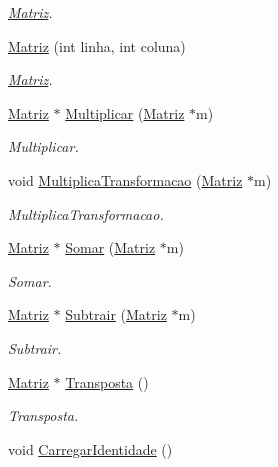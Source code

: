 \begin{DoxyCompactItemize}
\begin{DoxyCompactList}\small\item\em \hyperlink{class_matriz}{Matriz}. \end{DoxyCompactList}\item 
\hyperlink{class_matriz_a57a8c6b672158239b429c72f4b4e316c}{Matriz} (int linha, int coluna)
\begin{DoxyCompactList}\small\item\em \hyperlink{class_matriz}{Matriz}. \end{DoxyCompactList}\item 
\hyperlink{class_matriz}{Matriz} $\ast$ \hyperlink{class_matriz_af9f66302d01429ea558f420ba42175ab}{Multiplicar} (\hyperlink{class_matriz}{Matriz} $\ast$m)
\begin{DoxyCompactList}\small\item\em Multiplicar. \end{DoxyCompactList}\item 
void \hyperlink{class_matriz_adf1b06373979d8dd4074347a2f62eeb7}{Multiplica\+Transformacao} (\hyperlink{class_matriz}{Matriz} $\ast$m)
\begin{DoxyCompactList}\small\item\em Multiplica\+Transformacao. \end{DoxyCompactList}\item 
\hyperlink{class_matriz}{Matriz} $\ast$ \hyperlink{class_matriz_ae741af63b4094d2cb146cc0cba1a376b}{Somar} (\hyperlink{class_matriz}{Matriz} $\ast$m)
\begin{DoxyCompactList}\small\item\em Somar. \end{DoxyCompactList}\item 
\hyperlink{class_matriz}{Matriz} $\ast$ \hyperlink{class_matriz_ab210cb033064a42d99a71f4ac5266d4d}{Subtrair} (\hyperlink{class_matriz}{Matriz} $\ast$m)
\begin{DoxyCompactList}\small\item\em Subtrair. \end{DoxyCompactList}\item 
\hyperlink{class_matriz}{Matriz} $\ast$ \hyperlink{class_matriz_a4778d42de62e8d6b47a66fea73894cbd}{Transposta} ()
\begin{DoxyCompactList}\small\item\em Transposta. \end{DoxyCompactList}\item 
\hypertarget{class_matriz_a6d6e584c24c8c842054e5f1b163da4a8}{void \hyperlink{class_matriz_a6d6e584c24c8c842054e5f1b163da4a8}{Carregar\+Identidade} ()}\label{class_matriz_a6d6e584c24c8c842054e5f1b163da4a8}


\end{DoxyCompactItemize}
